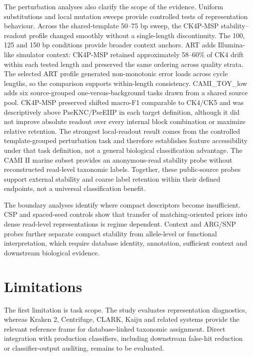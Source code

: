 The perturbation analyses also clarify the scope of the evidence. Uniform substitutions and local mutation sweeps provide controlled tests of representation behaviour. Across the shared-template 50--75 bp sweep, the CK4P-MSP stability--readout profile changed smoothly without a single-length discontinuity. The 100, 125 and 150 bp conditions provide broader context anchors. ART adds Illumina-like simulator context: CK4P-MSP retained approximately 58--60\% of CK4 drift within each tested length and preserved the same ordering across quality strata. The selected ART profile generated non-monotonic error loads across cycle lengths, so the comparison supports within-length consistency. CAMI\_TOY\_low adds six source-grouped one-versus-background tasks drawn from a shared source pool. CK4P-MSP preserved shifted macro-F1 comparable to CK4/CK5 and was descriptively above PseKNC/PseEIIP in each target definition, although it did not improve absolute readout over every internal block combination or maximize relative retention. The strongest local-readout result comes from the controlled template-grouped perturbation task and therefore establishes feature accessibility under that task definition, not a general biological classification advantage. The CAMI II marine subset provides an anonymous-read stability probe without reconstructed read-level taxonomic labels. Together, these public-source probes support external stability and coarse label retention within their defined endpoints, not a universal classification benefit.

The boundary analyses identify where compact descriptors become insufficient. CSP and spaced-seed controls show that transfer of matching-oriented priors into dense read-level representations is regime dependent. Context and ARG/SNP probes further separate compact stability from allele-level or functional interpretation, which require database identity, annotation, sufficient context and downstream biological evidence.

\FloatBarrier
\section{Limitations}

The first limitation is task scope. The study evaluates representation diagnostics, whereas Kraken 2, Centrifuge, CLARK, Kaiju and related systems provide the relevant reference frame for database-linked taxonomic assignment. Direct integration with production classifiers, including downstream false-hit reduction or classifier-output auditing, remains to be evaluated.

